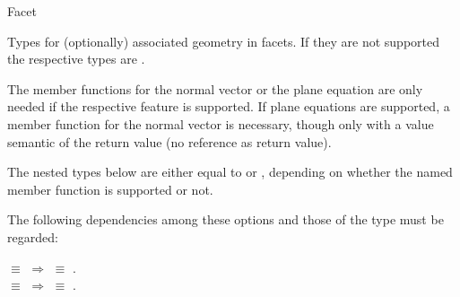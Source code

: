 \ccHtmlNoClassFile
\ccHtmlNoClassLinks
\ccHtmlNoClassIndex
\begin{ccClass}{Facet}

\ccTypes

Types for (optionally) associated geometry in facets. If they
are not supported the respective types are .

\ccGlue
{}

\ccOperations

The member functions for the normal vector or the plane equation are
only needed if the respective feature is supported. If plane equations
are supported, a member function for the normal vector is necessary,
though only with a value semantic of the return value (no reference as
return value).

\ccTagFullDeclarations

\ccGlue
{}

\ccGlue
{}

\ccTagDefaults


The nested types below are either equal to  or
, depending on whether the named member function
is supported or not.

\ccHtmlNoLinks
{}
\ccGlue
\ccHtmlNoLinks
{}

The following dependencies among these options and those of the
 type must be regarded:

 $\equiv$  $\Longrightarrow$
 $\equiv$ .
\\
 $\equiv$  $\Longrightarrow$
 $\equiv$ .

\end{ccClass}

